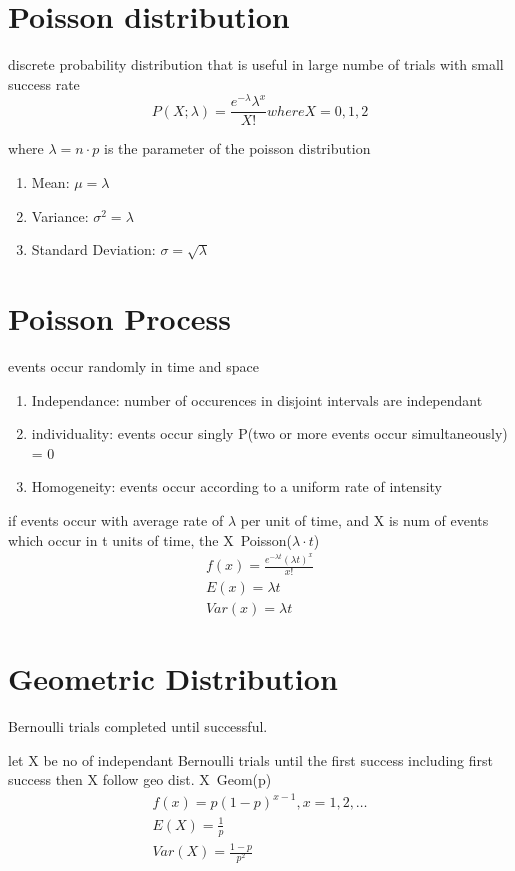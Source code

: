 \documentclass[11pt]{article}
\begin{document}
\section{Poisson distribution}
\par discrete probability distribution that is useful in large numbe of trials
with small success rate
\begin{equation}
  P(X;\lambda) = \frac{e^{-\lambda} \lambda^x}{X!} where X = 0,1,2
\end{equation}
\par where $\lambda = n \cdot p$ is the parameter of the poisson distribution
\begin{enumerate}
  \item Mean: $\mu = \lambda$
  \item Variance: $\sigma^2 = \lambda$
  \item Standard Deviation: $\sigma = \sqrt{\lambda}$
\end{enumerate}
\section{Poisson Process}
\par events occur randomly in time and space
\begin{enumerate}
  \item Independance: number of occurences in disjoint intervals are independant
  \item individuality: events occur singly P(two or more events occur simultaneously) = 0
  \item Homogeneity: events occur according to a uniform rate of intensity
\end{enumerate}
\par if events occur with average rate of $\lambda$ per unit of time, and X is
num of events which occur in t units of time, the X~Poisson($\lambda\cdot t$)
\begin{align*}
  f(x)  = \frac{e^{-\lambda t}(\lambda t)^x}{x!}\\
  E(x) = \lambda t\\
  Var(x) = \lambda t
\end{align*}
\section{Geometric Distribution}
\par Bernoulli trials completed until successful.
\par let X be no of independant Bernoulli trials until the first success including first success then X follow geo dist. X~Geom(p)
\begin{align*}
  f(x) = p(1-p)^{x-1}, x = 1,2,\dots\\
  E(X) = \frac{1}{p}\\
  Var(X) = \frac{1-p}{p^2}
\end{align*}
\end{document}
